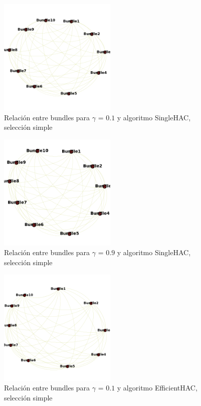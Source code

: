 \begin{figure}[H]
  \centering
    \includegraphics[width=0.5\textwidth]{resultados/authors/intra_inter/hac01.png}
  \caption{Relación entre bundles para $\gamma$ = $0.1$ y algoritmo SingleHAC, selección simple}
  \label{res:img-authors-gamma01-hac}
\end{figure}

\begin{figure}[H]
  \centering
    \includegraphics[width=0.5\textwidth]{resultados/authors/intra_inter/hac09.png}
  \caption{Relación entre bundles para $\gamma$ = $0.9$ y algoritmo SingleHAC, selección simple}
  \label{res:img-authors-gamma09-hac}
\end{figure}

\begin{figure}[H]
  \centering
    \includegraphics[width=0.5\textwidth]{resultados/authors/intra_inter/effhac01.png}
  \caption{Relación entre bundles para $\gamma$ = $0.1$ y algoritmo EfficientHAC, selección simple}
  \label{res:img-authors-gamma01-effhac}
\end{figure}

